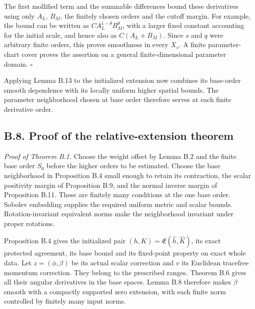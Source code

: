 \documentclass[
  english,
  11pt,
  reqno]{amsart}
\begin{document}
The first mollified term and the summable differences bound these
derivatives using only \(A_L\), \(B_M\), the finitely chosen orders and
the cutoff margin. For example, the bound can be written as
\(C A_L^{1-\theta}B_M^\theta\), with a larger fixed constant accounting
for the initial scale, and hence also as \(C(A_L+B_M)\). Since \(s\) and
\(q\) were arbitrary finite orders, this proves smoothness in every
\(X_s\). A finite parameter-chart cover proves the assertion on a
general finite-dimensional parameter domain. \hfill\(\square\)

Applying Lemma B.13 to the initialized extension now combines its
base-order smooth dependence with its locally uniform higher spatial
bounds. The parameter neighborhood chosen at base order therefore serves
at each finite derivative order.

\subsection{B.8. Proof of the relative-extension
theorem}\label{b.8.-proof-of-the-relative-extension-theorem}\label{sec:online-extension-proof-of-smooth-theorem}

\emph{Proof of Theorem B.1.} Choose the weight offset by Lemma B.2 and
the finite base order \(S_0\) before the higher orders to be estimated.
Choose the base neighborhood in Proposition B.4 small enough to retain
its contraction, the scalar positivity margin of Proposition B.9, and
the normal inverse margin of Proposition B.11. These are finitely many
conditions at the one base order. Sobolev embedding supplies the
required uniform metric and scalar bounds. Rotation-invariant equivalent
norms make the neighborhood invariant under proper rotations.

Proposition B.4 gives the initialized pair
\((h,K)=\mathfrak E(\widehat h,\widehat K)\), its exact protected
agreement, its base bound and its fixed-point property on exact whole
data. Let \(z=(\phi,\beta)\) be its actual scalar correction and \(v\)
its Euclidean tracefree momentum correction. They belong to the
prescribed ranges. Theorem B.6 gives all their angular derivatives in
the base spaces. Lemma B.8 therefore makes \(\beta\) smooth with a
compactly supported zero extension, with each finite norm controlled by
finitely many input norms.
\end{document}
